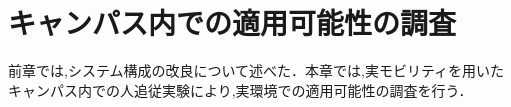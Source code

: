 \chapter{キャンパス内での適用可能性の調査}
\label{chap:chibatech}
%
%
前章では,システム構成の改良について述べた．本章では,実モビリティを用いたキャンパス内での人追従実験により,実環境での適用可能性の調査を行う．
%

%
